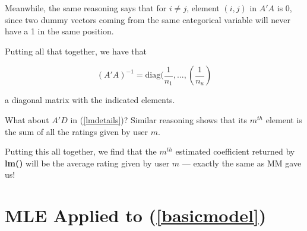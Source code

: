 Meanwhile, the same reasoning says that for $i \neq j$, element $(i,j)$
in $A'A$ is 0, since two dummy vectors coming from the same categorical
variable will never have a 1 in the same position.

Putting all that together, we have that

\begin{equation}
(A'A)^{-1} = \textrm{diag}(\frac{1}{n_1},...,(\frac{1}{n_u})
\end{equation}

a diagonal matrix with the indicated elements.

What about $A'D$ in (\ref{lmdetails})?  Similar reasoning shows that
its $m^{th}$ element is the sum of all the ratings given by user $m$.

Putting this all together, we find that the $m^{th}$ estimated
coefficient returned by \textbf{lm()} will be the average rating given
by user $m$ --- exactly the same as MM gave us!

\section{MLE Applied to (\ref{basicmodel})} 

